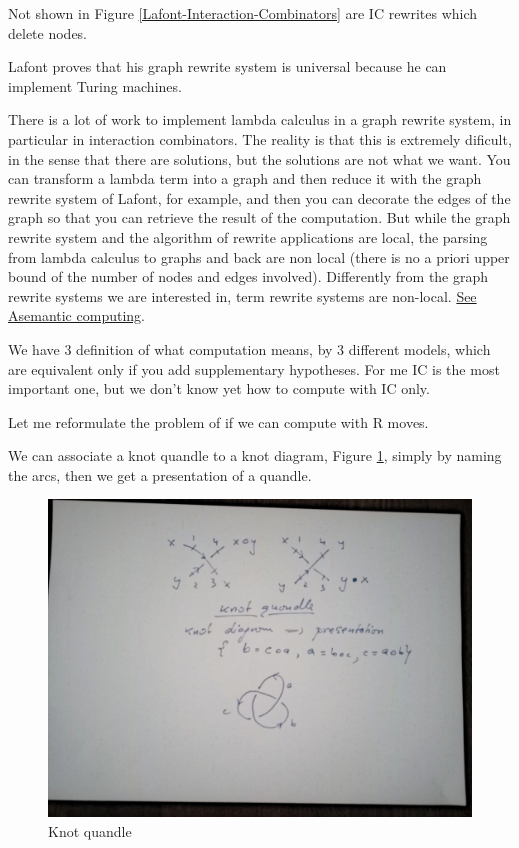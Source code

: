 \documentclass[]{article}
\begin{document}
Not shown in Figure \ref{Lafont-Interaction-Combinators} are IC rewrites which delete nodes.

Lafont proves that his graph rewrite system is universal because he can
implement Turing machines.

There is a lot of work to implement lambda calculus in a graph rewrite
system, in particular in interaction combinators. The reality is that
this is extremely dificult, in the sense that there are solutions, but
the solutions are not what we want. You can transform a lambda term into
a graph and then reduce it with the graph rewrite system of Lafont, for
example, and then you can decorate the edges of the graph so that you
can retrieve the result of the computation. But while the graph rewrite
system and the algorithm of rewrite applications are local, the parsing
from lambda calculus to graphs and back are non local (there is no a
priori upper bound of the number of nodes and edges involved).
Differently from the graph rewrite systems we are interested in, term
rewrite systems are non-local.
\href{https://telegra.ph/Asemantic-computing-03-02}{See Asemantic
computing}.

We have 3 definition of what computation means, by 3 different models,
which are equivalent only if you add supplementary hypotheses. For me IC
is the most important one, but we don't know yet how to compute with IC
only.

Let me reformulate the problem of if we can compute with R moves.

We can associate a knot quandle to a knot diagram, Figure \ref{Knot-quandle}, simply by naming the
arcs, then we get a presentation of a quandle.

\begin{figure}[h!]
\centering
\includegraphics[width=0.75\linewidth]{img/3423.jpg}
\caption{Knot quandle}
\label{Knot-quandle}
\end{figure}
\end{document}
